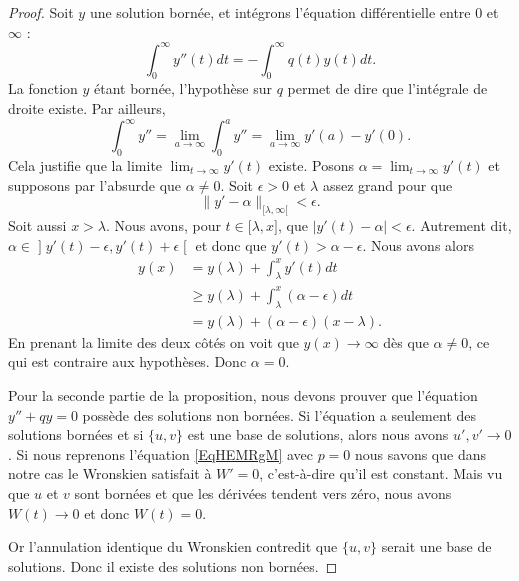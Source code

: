 \begin{proof}
	Soit \( y\) une solution bornée, et intégrons l'équation différentielle entre \( 0\) et \( \infty\) :
	\begin{equation}
		\int_0^{\infty}y''(t)dt=-\int_0^{\infty}q(t)y(t)dt.
	\end{equation}
	La fonction \( y\) étant bornée, l'hypothèse sur \( q\) permet de dire que l'intégrale de droite existe. Par ailleurs,
	\begin{equation}
		\int_0^{\infty}y''=\lim_{a\to \infty}\int_0^ay''=\lim_{a\to \infty}y'(a)-y'(0).
	\end{equation}
	Cela justifie que la limite \( \lim_{t\to \infty} y'(t)\) existe. Posons \( \alpha=\lim_{t\to \infty} y'(t)\) et supposons par l'absurde que \( \alpha\neq 0\). Soit \( \epsilon>0\) et \( \lambda\) assez grand pour que
	\begin{equation}
		\| y'-\alpha \|_{\mathopen[ \lambda , \infty [}<\epsilon.
	\end{equation}
	Soit aussi \( x>\lambda\). Nous avons, pour \( t\in \mathopen[ \lambda,x\mathclose]\), que \( | y'(t)-\alpha |<\epsilon\). Autrement dit, \( \alpha\in\mathopen] y'(t)-\epsilon,y'(t)+\epsilon\mathclose[\) et donc que \( y'(t)>\alpha-\epsilon\). Nous avons alors
	\begin{subequations}
		\begin{align}
			y(x) & =y(\lambda) + \int_{\lambda}^x y'(t)dt                  \\
			     & \geq y(\lambda) + \int_{\lambda}^x (\alpha-\epsilon) dt \\
			     & =y(\lambda) + (\alpha-\epsilon)(x - \lambda).
		\end{align}
	\end{subequations}
	En prenant la limite des deux côtés on voit que \( y(x)\to \infty\) dès que \( \alpha\neq 0\), ce qui est contraire aux hypothèses. Donc \( \alpha=0\).

	Pour la seconde partie de la proposition, nous devons prouver que l'équation \( y''+qy=0\) possède des solutions non bornées. Si l'équation a seulement des solutions bornées et si \( \{ u,v \}\) est une base de solutions, alors nous avons \( u',v'\to 0\). Si nous reprenons l'équation \eqref{EqHEMRgM} avec \( p=0\) nous savons que dans notre cas le Wronskien satisfait à \( W'=0\), c'est-à-dire qu'il est constant. Mais vu que \( u\) et \( v\) sont bornées et que les dérivées tendent vers zéro, nous avons \( W(t)\to 0\) et donc \( W(t)=0\).

	Or l'annulation identique du Wronskien contredit que \( \{ u,v \}\) serait une base de solutions. Donc il existe des solutions non bornées.
\end{proof}

